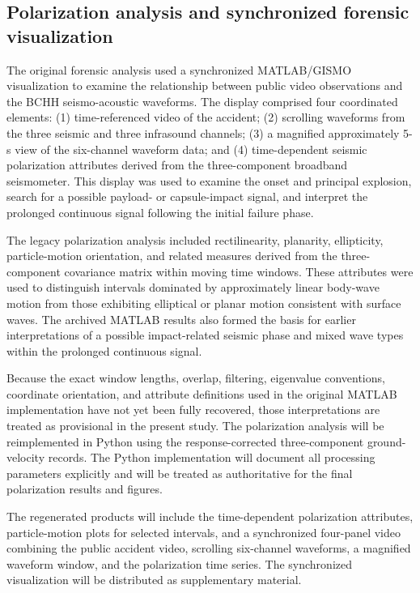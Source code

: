 \documentclass[]{seismica}
\begin{document}
\subsection{Polarization analysis and synchronized forensic visualization}
\label{sec:methods_polarization}

The original forensic analysis used a synchronized MATLAB/GISMO visualization
to examine the relationship between public video observations and the BCHH
seismo-acoustic waveforms. The display comprised four coordinated elements:
(1) time-referenced video of the accident; (2) scrolling waveforms from the
three seismic and three infrasound channels; (3) a magnified approximately
5-s view of the six-channel waveform data; and (4) time-dependent seismic
polarization attributes derived from the three-component broadband
seismometer. This display was used to examine the onset and principal
explosion, search for a possible payload- or capsule-impact signal, and
interpret the prolonged continuous signal following the initial failure phase.

The legacy polarization analysis included rectilinearity, planarity,
ellipticity, particle-motion orientation, and related measures derived from
the three-component covariance matrix within moving time windows. These
attributes were used to distinguish intervals dominated by approximately
linear body-wave motion from those exhibiting elliptical or planar motion
consistent with surface waves. The archived MATLAB results also formed the
basis for earlier interpretations of a possible impact-related seismic phase
and mixed wave types within the prolonged continuous signal.

Because the exact window lengths, overlap, filtering, eigenvalue conventions,
coordinate orientation, and attribute definitions used in the original
MATLAB implementation have not yet been fully recovered, those interpretations
are treated as provisional in the present study. The polarization analysis
will be reimplemented in Python using the response-corrected three-component
ground-velocity records. The Python implementation will document all processing
parameters explicitly and will be treated as authoritative for the final
polarization results and figures.

The regenerated products will include the time-dependent polarization
attributes, particle-motion plots for selected intervals, and a synchronized
four-panel video combining the public accident video, scrolling six-channel
waveforms, a magnified waveform window, and the polarization time series.
The synchronized visualization will be distributed as supplementary material.
\end{document}

